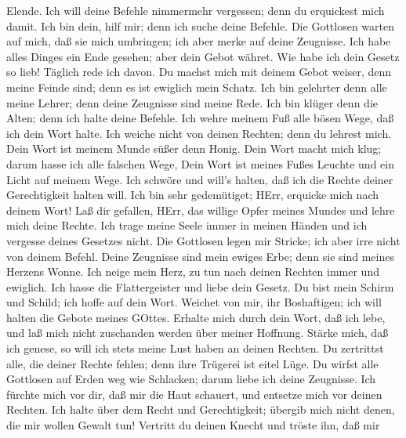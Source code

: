 Elende.  Ich will deine Befehle nimmermehr vergessen; denn
du erquickest mich damit.  Ich bin dein, hilf mir; denn ich
suche deine Befehle.  Die Gottlosen warten auf mich, daß
sie mich umbringen; ich aber merke auf deine Zeugnisse. 
Ich habe alles Dinges ein Ende gesehen; aber dein Gebot währet.
 Wie habe ich dein Gesetz so lieb! Täglich rede ich davon.
 Du machst mich mit deinem Gebot weiser, denn meine Feinde
sind; denn es ist ewiglich mein Schatz.  Ich bin gelehrter
denn alle meine Lehrer; denn deine Zeugnisse sind meine Rede.
 Ich bin klüger denn die Alten; denn ich halte deine
Befehle.  Ich wehre meinem Fuß alle bösen Wege, daß ich
dein Wort halte.  Ich weiche nicht von deinen Rechten;
denn du lehrest mich.  Dein Wort ist meinem Munde süßer
denn Honig.  Dein Wort macht mich klug; darum hasse ich
alle falschen Wege,  Dein Wort ist meines Fußes Leuchte
und ein Licht auf meinem Wege.  Ich schwöre und will's
halten, daß ich die Rechte deiner Gerechtigkeit halten will.
 Ich bin sehr gedemütiget; HErr, erquicke mich nach deinem
Wort!  Laß dir gefallen, HErr, das willige Opfer meines
Mundes und lehre mich deine Rechte.  Ich trage meine Seele
immer in meinen Händen und ich vergesse deines Gesetzes nicht.
 Die Gottlosen legen mir Stricke; ich aber irre nicht von
deinem Befehl.  Deine Zeugnisse sind mein ewiges Erbe;
denn sie sind meines Herzens Wonne.  Ich neige mein Herz,
zu tun nach deinen Rechten immer und ewiglich.  Ich hasse
die Flattergeister und liebe dein Gesetz.  Du bist mein
Schirm und Schild; ich hoffe auf dein Wort.  Weichet von
mir, ihr Boshaftigen; ich will halten die Gebote meines GOttes.
 Erhalte mich durch dein Wort, daß ich lebe, und laß mich
nicht zuschanden werden über meiner Hoffnung.  Stärke
mich, daß ich genese, so will ich stets meine Lust haben an deinen
Rechten.  Du zertrittst alle, die deiner Rechte fehlen;
denn ihre Trügerei ist eitel Lüge.  Du wirfst alle
Gottlosen auf Erden weg wie Schlacken; darum liebe ich deine Zeugnisse.
 Ich fürchte mich vor dir, daß mir die Haut schauert, und
entsetze mich vor deinen Rechten.  Ich halte über dem
Recht und Gerechtigkeit; übergib mich nicht denen, die mir wollen Gewalt
tun!  Vertritt du deinen Knecht und tröste ihn, daß mir
